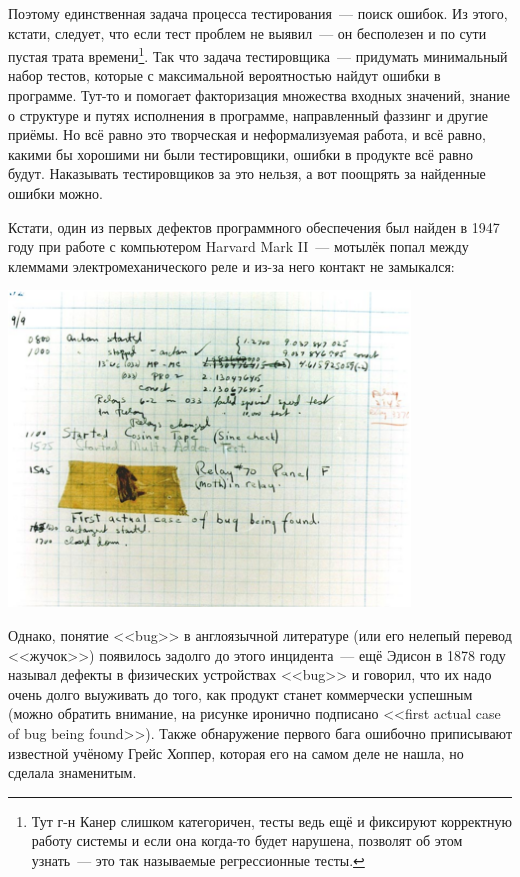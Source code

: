 \documentclass{../../text-style}
\begin{document}
Поэтому единственная задача процесса тестирования~--- поиск ошибок. Из этого, кстати, следует, что если тест проблем не выявил~--- он бесполезен и по сути пустая трата времени\footnote{Тут г-н Канер слишком категоричен, тесты ведь ещё и фиксируют корректную работу системы и если она когда-то будет нарушена, позволят об этом узнать~--- это так называемые регрессионные тесты.}. Так что задача тестировщика~--- придумать минимальный набор тестов, которые с максимальной вероятностью найдут ошибки в программе. Тут-то и помогает факторизация множества входных значений, знание о структуре и путях исполнения в программе, направленный фаззинг и другие приёмы. Но всё равно это творческая и неформализуемая работа, и всё равно, какими бы хорошими ни были тестировщики, ошибки в продукте всё равно будут. Наказывать тестировщиков за это нельзя, а вот поощрять за найденные ошибки можно.

Кстати, один из первых дефектов программного обеспечения был найден в 1947 году при работе с компьютером Harvard Mark II~--- мотылёк попал между клеммами электромеханического реле и из-за него контакт не замыкался:

\begin{center}
    \includegraphics[width=0.8\textwidth]{bug.png}
\end{center}

Однако, понятие <<bug>> в англоязычной литературе (или его нелепый перевод <<жучок>>) появилось задолго до этого инцидента~--- ещё Эдисон в 1878 году называл дефекты в физических устройствах <<bug>> и говорил, что их надо очень долго выуживать до того, как продукт станет коммерчески успешным (можно обратить внимание, на рисунке иронично подписано <<first actual case of bug being found>>). Также обнаружение первого бага ошибочно приписывают известной учёному Грейс Хоппер, которая его на самом деле не нашла, но сделала знаменитым.
\end{document}
